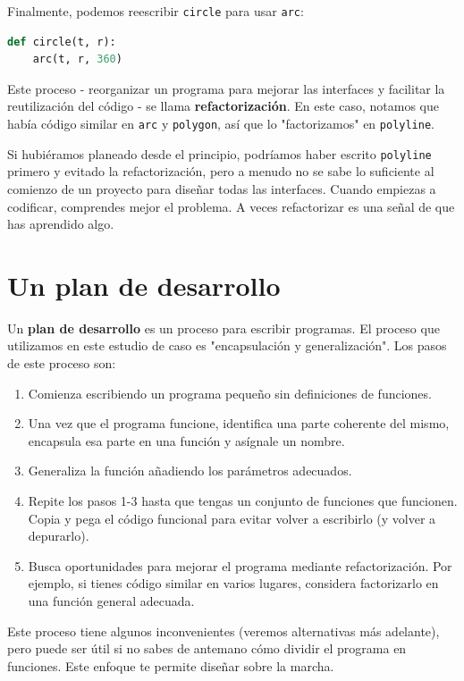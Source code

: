 Finalmente, podemos reescribir \texttt{circle} para usar \texttt{arc}:

\begin{lstlisting}[language=Python]
def circle(t, r):
    arc(t, r, 360)
\end{lstlisting}

Este proceso - reorganizar un programa para mejorar las interfaces y facilitar la reutilización del código - se llama \textbf{refactorización}. En este caso, notamos que había código similar en \texttt{arc} y \texttt{polygon}, así que lo "factorizamos" en \texttt{polyline}.

Si hubiéramos planeado desde el principio, podríamos haber escrito \texttt{polyline} primero y evitado la refactorización, pero a menudo no se sabe lo suficiente al comienzo de un proyecto para diseñar todas las interfaces. Cuando empiezas a codificar, comprendes mejor el problema. A veces refactorizar es una señal de que has aprendido algo.


\section{Un plan de desarrollo}

Un \textbf{plan de desarrollo} es un proceso para escribir programas. El proceso que utilizamos en este estudio de caso es "encapsulación y generalización". Los pasos de este proceso son:

\begin{enumerate}
    \item Comienza escribiendo un programa pequeño sin definiciones de funciones.
    \item Una vez que el programa funcione, identifica una parte coherente del mismo, encapsula esa parte en una función y asígnale un nombre.
    \item Generaliza la función añadiendo los parámetros adecuados.
    \item Repite los pasos 1-3 hasta que tengas un conjunto de funciones que funcionen. Copia y pega el código funcional para evitar volver a escribirlo (y volver a depurarlo).
    \item Busca oportunidades para mejorar el programa mediante refactorización. Por ejemplo, si tienes código similar en varios lugares, considera factorizarlo en una función general adecuada.
\end{enumerate}

Este proceso tiene algunos inconvenientes (veremos alternativas más adelante), pero puede ser útil si no sabes de antemano cómo dividir el programa en funciones. Este enfoque te permite diseñar sobre la marcha.

